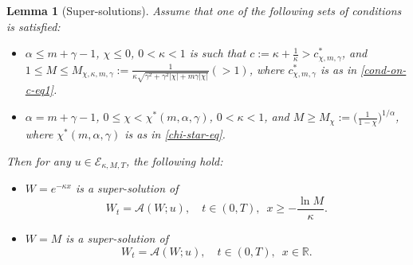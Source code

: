\documentclass[11pt]{article} %
\newtheorem{lemma}{Lemma}[section]
\theoremstyle{remark}
\theoremstyle{remark}
\numberwithin{equation}{section}
\numberwithin{figure}{section}
\numberwithin{table}{section}
\newcommand\RR{\ensuremath{\mathbb{R}}}
\begin{document}
\begin{lemma}[Super-solutions]
\label{prelim-super-lm} 
Assume that one of the following sets of conditions is satisfied:
\begin{itemize}
\item[(i)]  $\alpha\le m+\gamma -1$,  $\chi\le 0$, 
   $0<\kappa <1$ is such that $c:=\kappa+\frac{1}{\kappa}>c_{\chi,m,\gamma}^*$,
 and
$1\le M\le M_{\chi,\kappa,m,\gamma}:=\frac{1}{\kappa \sqrt {\gamma^2+\gamma^2|\chi|+m\gamma |\chi|}}(>1)$, where $c^*_{\chi,m,\gamma}$ is as in  \eqref{cond-on-c-eq1}.
  
\item[(ii)] $\alpha=m+\gamma-1$,    $0\le \chi<\chi^*(m,\alpha,\gamma)$,  
   $0<\kappa <1$,  and   $M\ge M_\chi:=\big( \frac{1}{1-\chi}\big)^{1/\alpha}$, where $\chi^*(m,\alpha,\gamma)$ is as in \eqref{chi-star-eq}.
\end{itemize}
Then 
for any $u\in \mathcal{E}_{\kappa,M,T}$, the following hold:
\begin{itemize}
\item[(1)]  $W= e^{-\kappa x}$ is a super-solution of
$$
W_t=\mathcal{A}(W;u), \quad t\in (0,T),\, \,\, x\ge -\frac{\ln M}{\kappa}.
$$

\item[(2)]   $W=M$ is a super-solution of
$$
W_t=\mathcal{A}(W;u), \quad t\in (0,T),\,\,\, x\in\RR.
$$
\end{itemize}
\end{lemma}
\end{document}
